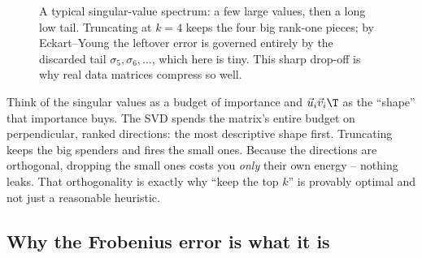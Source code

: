 \begin{figure}[H]
\centering
{}
\caption{A typical singular-value spectrum: a few large values, then a long
low tail. Truncating at $k=4$ keeps the four big rank-one pieces; by
Eckart--Young the leftover error is governed entirely by the discarded tail
$\sigma_5,\sigma_6,\dots$, which here is tiny. This sharp drop-off is why real
data matrices compress so well.}
\label{ch29:fig-sv-spectrum}
\end{figure}

\begin{intuitionbox}
Think of the singular values as a budget of importance and $\vec{u}_i\vec{v}_i\T$
as the ``shape'' that importance buys. The SVD spends the matrix's entire budget
on perpendicular, ranked directions: the most descriptive shape first. Truncating
keeps the big spenders and fires the small ones. Because the directions are
orthogonal, dropping the small ones costs you \emph{only} their own energy --
nothing leaks. That orthogonality is exactly why ``keep the top $k$'' is provably
optimal and not just a reasonable heuristic.
\end{intuitionbox}

\subsection{Why the Frobenius error is what it is}

